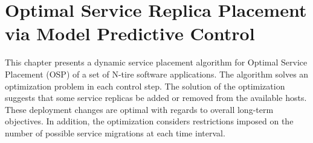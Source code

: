 

\chapter{Optimal Service Replica Placement via Model Predictive Control}
\label{ch:replica_placement_through_mpc}    

This chapter presents a dynamic service placement algorithm for Optimal Service Placement (OSP) of a set of N-tire software applications. The algorithm solves an optimization problem in each control step. 
The solution of the optimization suggests that some service replicas be added or removed from the available hosts. These deployment changes are optimal with regards to overall long-term objectives. In addition, the optimization considers restrictions imposed on the number of possible service migrations at each time interval.  



